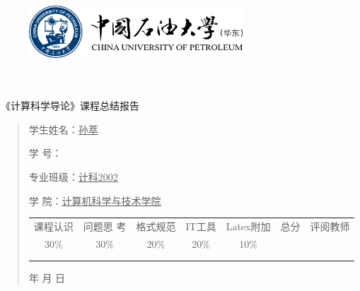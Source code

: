 \documentclass{article}
\renewcommand{\today}{\number\year 年 \number\month 月 \number\day 日}
\begin{document}
\begin{figure}
    \centering
    \includegraphics[width=8cm]{upc.png}

    \label{figupc}
\end{figure}

	\begin{center}
		\quad \\
		\quad \\
		\heiti \fontsize{45}{17} \quad \quad \quad 
		\vskip 1.5cm
		\heiti {} 《计算科学导论》课程总结报告
	\end{center}
	\vskip 2.0cm
		
	\begin{quotation}
		\doublespacing
		
        \par\setlength\parindent{7em}
		\quad 

		学生姓名：\underline{\qquad  孙萃 \qquad \qquad}

		学\hspace{0.61cm} 号：\underline{\qquad}
		
		专业班级：\underline{\qquad 计科2002 \qquad  }
		
        学\hspace{0.61cm} 院：\underline{计算机科学与技术学院}
		\vskip 2cm
		\centering
		\begin{table}[h]
            \centering 
            \begin{tabular}{|c|c|c|c|c|c|c|}
                \hline
                课程认识 & 问题思 考 & 格式规范  & IT工具  & Latex附加  & 总分 & 评阅教师 \\
                30\% & 30\% & 20\% & 20\% & 10\% &  &  \\
                \hline
                 & & & & & &\\
                & & & & & &\\
                \hline
            \end{tabular}
        \end{table}
		\vskip 2cm
		\today
	\end{quotation}
\end{document}
